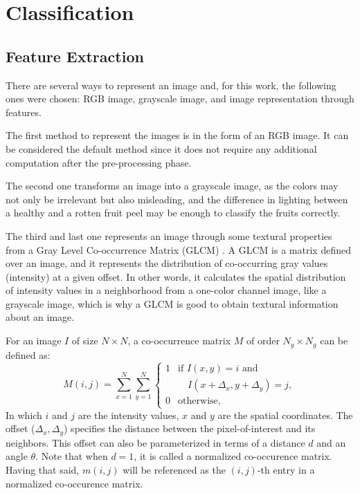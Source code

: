 \documentclass[../main.tex]{subfile}
\begin{document}
\section{Classification} \label{sec:classification}

    \subsection{Feature Extraction} \label{subsec:features-extraction}
    There are several ways to represent an image and, for this work, the following ones were chosen: RGB image, grayscale image, and image representation through features.
    
    The first method to represent the images is in the form of an RGB image. It can be considered the default method since it does not require any additional computation after the pre-processing phase.
    
    The second one transforms an image into a grayscale image, as the colors may not only be irrelevant but also misleading, and the difference in lighting between a healthy and a rotten fruit peel may be enough to classify the fruits correctly.
    
    The third and last one represents an image through some textural properties from a Gray Level Co-occurrence Matrix (GLCM) \cite{IV-item1}.
    A GLCM is a matrix defined over an image, and it represents the distribution of co-occurring gray values (intensity) at a given offset. In other words, it calculates the spatial distribution of intensity values in a neighborhood from a one-color channel image, like a grayscale image, which is why a GLCM is good to obtain textural information about an image.
    
    For an image $I$ of size $N \times N$, a co-occurrence matrix $M$ of order $N_{g} \times N_{g}$ can be defined as:
    \begin{equation}
        M(i,j) = \sum^{N}_{x=1}\sum^{N}_{y=1}
        \begin{cases}
            1 & \mbox{if } I(x,y) = i \mbox{ and } \\
              &\quad I(x + \Delta_{x}, y + \Delta_{y}) = j, \\
            0 & \mbox{otherwise},
        \end{cases}
    \end{equation}
    In which $i$ and $j$ are the intensity values, $x$ and $y$ are the spatial coordinates. The offset ($\Delta_{x}, \Delta_{y}$) specifies the distance between the pixel-of-interest and its neighbors. This offset can also be parameterized in terms of a distance $d$ and an angle $\theta$. Note that when $d = 1$, it is called a normalized co-occurence matrix. Having that said, $m(i,j)$ will be referenced as the $(i,j)$-th entry in a normalized co-occurence matrix.
    
\end{document}

